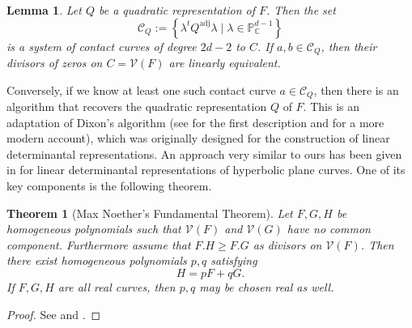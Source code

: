 \documentclass[a4paper,10pt]{amsart}
\theoremstyle{definition}
\theoremstyle{plain}
\newtheorem{thm}[Def]{Theorem}
\newtheorem{lem}[Def]{Lemma}
\newcommand{\adj}{\operatorname{adj}} %
\newcommand{\cC}{{\mathcal C}}
\newcommand{\cV}{{\mathcal V}}
\newcommand{\C}{{\mathbb C}}
\newcommand{\pp}{\mathbb{P}}
\begin{document}
\begin{lem}
    Let $Q$ be a quadratic representation of $F$. Then the set
    \begin{equation*}
        \cC_Q := \left\lbrace \lambda^t Q^{\adj} \lambda \mid \lambda \in \pp^{d-1}_\C \right\rbrace
    \end{equation*}
    is a system of contact curves of degree $2d-2$ to $C$. If $a, b \in \cC_Q$, then their divisors of zeros on $C = \cV(F)$ are linearly equivalent.
\end{lem}

Conversely, if we know at least one such contact curve $a \in \cC_Q$, then there is an algorithm that recovers the quadratic representation $Q$ of $F$. This is an adaptation of Dixon's algorithm (see \cite{Dixon1902LDR} for the first description and \cite{Vinnikov1989LDR} for a more modern account), which was originally designed for the construction of linear determinantal representations. An approach very similar to ours has been given in \cite[\S 4]{hvelemt} for linear determinantal representations of hyperbolic plane curves. One of its key components is the following theorem.

\begin{thm}[Max Noether's Fundamental Theorem] \label{thm:AF+BG}
    Let $F,G,H$ be homogeneous polynomials such that $\cV(F)$ and $\cV(G)$ have no common component. Furthermore assume that $F.H \geq F.G$ as divisors on $\cV(F)$. Then there exist homogeneous polynomials $p,q$ satisfying
    \begin{equation*}
        H = pF + qG.
    \end{equation*}
    If $F,G,H$ are all real curves, then $p,q$ may be chosen real as well.
\end{thm}

\begin{proof}
    See \cite[\S 5.5]{FultonCurves} and \cite[Theorem 4.1]{hvelemt}.
\end{proof}
\end{document}

